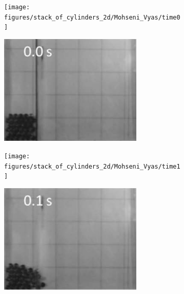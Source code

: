 \documentclass[preprint,12pt]{elsarticle}
\begin{document}
\begin{figure}[!htpb]
  \centering
  \begin{subfigure}{0.48\textwidth}
    \centering
    \texttt{[image: figures/stack\_of\_cylinders\_2d/Mohseni\_Vyas/time0]}
  \end{subfigure}
  \begin{subfigure}{0.48\textwidth}
    \centering
    \includegraphics[width=0.75\textwidth]{images/stack_of_cylinders_experimental_images/time0}
  \end{subfigure}

  \begin{subfigure}{0.48\textwidth}
    \centering
    \texttt{[image: figures/stack\_of\_cylinders\_2d/Mohseni\_Vyas/time1]}
  \end{subfigure}
  \begin{subfigure}{0.48\textwidth}
    \centering
    \includegraphics[width=0.75\textwidth]{images/stack_of_cylinders_experimental_images/time1}
  \end{subfigure}


\end{figure}
\end{document}
